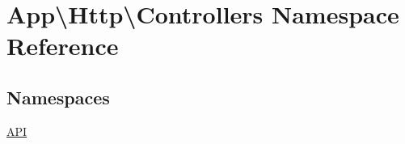 \hypertarget{namespace_app_1_1_http_1_1_controllers}{}\section{App\textbackslash{}Http\textbackslash{}Controllers Namespace Reference}
\label{namespace_app_1_1_http_1_1_controllers}
\subsection*{Namespaces}
\begin{DoxyCompactItemize}
\item 
 \mbox{\hyperlink{namespace_app_1_1_http_1_1_controllers_1_1_a_p_i}{A\+PI}}
\end{DoxyCompactItemize}
